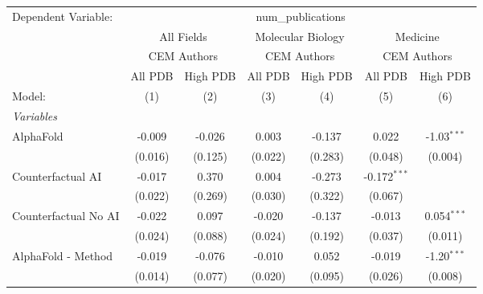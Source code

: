 \begingroup
\centering
\begin{tabular}{lcccccc}
   \tabularnewline \midrule \midrule
   Dependent Variable: & \multicolumn{6}{c}{num\_publications}\\
 & \multicolumn{2}{c}{All Fields} & \multicolumn{2}{c}{Molecular Biology} & \multicolumn{2}{c}{Medicine} \\
\cmidrule(lr){2-3} \cmidrule(lr){4-5} \cmidrule(lr){6-7}
 & \multicolumn{2}{c}{CEM Authors} & \multicolumn{2}{c}{CEM Authors} & \multicolumn{2}{c}{CEM Authors} \\
\cmidrule(lr){2-3} \cmidrule(lr){4-5} \cmidrule(lr){6-7}
 & \multicolumn{1}{c}{All PDB} & \multicolumn{1}{c}{High PDB} & \multicolumn{1}{c}{All PDB} & \multicolumn{1}{c}{High PDB} & \multicolumn{1}{c}{All PDB} & \multicolumn{1}{c}{High PDB} \\
\cmidrule(lr){2-2} \cmidrule(lr){3-3} \cmidrule(lr){4-4} \cmidrule(lr){5-5} \cmidrule(lr){6-6} \cmidrule(lr){7-7}
   Model:                                                     & (1)          & (2)     & (3)     & (4)     & (5)            & (6)\\  
   \midrule
   \emph{Variables}\\
   AlphaFold                                                  & -0.009       & -0.026  & 0.003   & -0.137  & 0.022          & -1.03$^{***}$\\   
                                                              & (0.016)      & (0.125) & (0.022) & (0.283) & (0.048)        & (0.004)\\   
   Counterfactual AI                                          & -0.017       & 0.370   & 0.004   & -0.273  & -0.172$^{***}$ &   \\   
                                                              & (0.022)      & (0.269) & (0.030) & (0.322) & (0.067)        &   \\   
   Counterfactual No AI                                       & -0.022       & 0.097   & -0.020  & -0.137  & -0.013         & 0.054$^{***}$\\   
                                                              & (0.024)      & (0.088) & (0.024) & (0.192) & (0.037)        & (0.011)\\   
   AlphaFold - Method                                         & -0.019       & -0.076  & -0.010  & 0.052   & -0.019         & -1.20$^{***}$\\   
                                                              & (0.014)      & (0.077) & (0.020) & (0.095) & (0.026)        & (0.008)\\   

\end{tabular}
